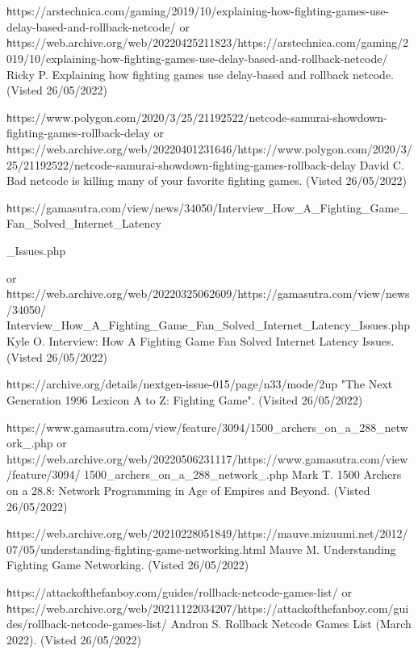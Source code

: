 \documentclass{entcs}
\begin{document}
\begin{thebibliography}{25}
 {\texttt https://arstechnica.com/gaming/2019/10/explaining-how-fighting-games-use-delay-based-and-rollback-netcode/} or {\texttt https://web.archive.org/web/20220425211823/https://arstechnica.com/gaming/2019/10/explaining-how-fighting-games-use-delay-based-and-rollback-netcode/} Ricky P. Explaining how fighting games use delay-based and rollback netcode. (Visted 26/05/2022)

 {\texttt https://www.polygon.com/2020/3/25/21192522/netcode-samurai-showdown-fighting-games-rollback-delay} or {\texttt https://web.archive.org/web/20220401231646/https://www.polygon.com/2020/3/25/21192522/netcode-samurai-showdown-fighting-games-rollback-delay} David C. Bad netcode is killing many of your favorite fighting
games. (Visted 26/05/2022)

 {\texttt https://gamasutra.com/view/news/34050/Interview\_How\_A\_Fighting\_Game\_Fan\_Solved\_Internet\_Latency

\_Issues.php} or {\texttt https://web.archive.org/web/20220325062609/https://gamasutra.com/view/news/34050/
Interview\_How\_A\_Fighting\_Game\_Fan\_Solved\_Internet\_Latency\_Issues.php} Kyle O. Interview: How A Fighting Game Fan Solved Internet Latency Issues. (Visted 26/05/2022)

 {\texttt https://archive.org/details/nextgen-issue-015/page/n33/mode/2up} "The Next Generation 1996 Lexicon A to Z: Fighting Game". (Visited 26/05/2022)

 {\texttt https://www.gamasutra.com/view/feature/3094/1500\_archers\_on\_a\_288\_network\_.php} or {https://web.archive.org/web/20220506231117/https://www.gamasutra.com/view/feature/3094/
1500\_archers\_on\_a\_288\_network\_.php} Mark T. 1500 Archers on a 28.8: Network Programming in Age of Empires and Beyond. (Visted 26/05/2022)

 {\texttt https://web.archive.org/web/20210228051849/https://mauve.mizuumi.net/2012/07/05/understanding-fighting-game-networking.html} Mauve M. Understanding Fighting Game Networking. (Visted 26/05/2022)

 {\texttt https://attackofthefanboy.com/guides/rollback-netcode-games-list/} or {\texttt https://web.archive.org/web/20211122034207/https://attackofthefanboy.com/guides/rollback-netcode-games-list/} Andron S. Rollback Netcode Games List (March 2022). (Visted 26/05/2022)


\end{thebibliography}
\end{document}
